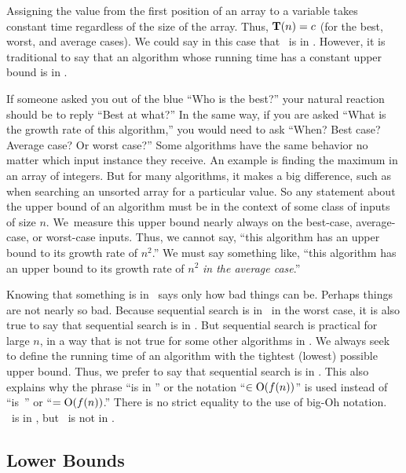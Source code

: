 \begin{example}
Assigning the value from the first position of an array to a variable
takes constant time regardless of the size of the
array.
Thus, \(\mbox{$\textbf{T}(n)$} = c\) (for the best, worst, and average cases).
We could say in this case that \Tn\ is in \Oc.
However, it is traditional to say that an algorithm whose running time
has a constant upper bound is in \Oone.
\end{example}

If someone asked you out of the blue ``Who is the best?'' your natural
reaction should be to reply ``Best at what?''
In the same way, if you are asked ``What is the growth rate of this
algorithm,'' you would need to ask ``When? Best case? Average case? Or
worst case?''
Some algorithms have the same behavior no matter which input instance
they receive.
An example is finding the maximum in an array of integers.
But for many algorithms, it makes a big difference, such as when
searching an unsorted array for a particular value.
So any statement about the upper bound of an algorithm
must be in the context of some class of inputs of size \(n\).
We~measure this upper bound nearly always on the best-case,
average-case, or worst-case inputs.
Thus, we cannot say, ``this algorithm has an upper bound to its growth
rate of \(n^2\).''
We must say something like, ``this algorithm has an upper bound to its
growth rate of \(n^2\) \emph{in the average case}.''

Knowing that something is in \Ofn\ says only how bad things can be.
Perhaps things are not nearly so bad.
Because sequential search is in \On\
in the worst case,
it is also true to say that sequential search is in \Ontwo.
But sequential search is practical for large \(n\), in a way that is
not true for some other algorithms in \Ontwo.
We always seek to define the running time of an algorithm
with the tightest (lowest) possible upper bound.
Thus, we prefer to say that sequential search is in \On.
This also explains why the phrase ``is in \Ofn'' or the notation
``\(\in \mbox{${\rm O}(f(n))$}\)'' is used instead of ``is~\Ofn'' or ``\(= \mbox{${\rm O}(f(n))$}\).''
There is no strict equality to the use of big-Oh notation.
\On\ is in \Ontwo, but \Ontwo\ is not in \On.

\subsection{Lower Bounds}

